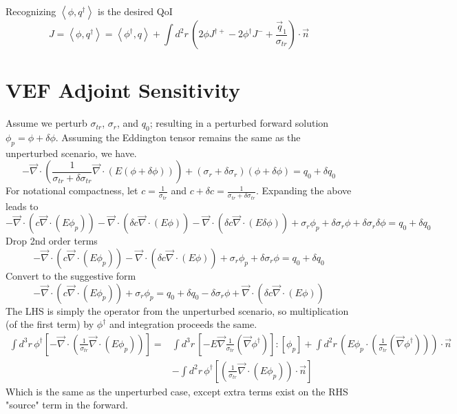\documentclass{article}
\newcommand{\bra}{\left\langle}
\newcommand{\ket}{\right\rangle}
\newcommand{\vdiv}{\vec{\nabla} \cdot}
\newcommand{\vgrad}{\vec{\nabla}}
\begin{document}
Recognizing $\bra \phi, q^\dag \ket $ is the desired QoI
\[
J = \bra \phi, q^\dag \ket = \bra \phi^\dag , q \ket + \int d^2 r \, \left(  2\phi J^{ \dag + } - 2\phi^\dag J^-  + \frac{\vec{q}_1}{\sigma_{tr}} \right) \cdot \vec{n}
\]
\section{VEF Adjoint Sensitivity}
Assume we perturb $\sigma_{tr}$, $\sigma_r$, and $q_0$; resulting in a perturbed forward solution $\phi_p = \phi + \delta \phi$. Assuming the Eddington tensor remains the same as the unperturbed scenario, we have.
\[
-\vdiv \left( \frac{1}{\sigma_{tr}+\delta \sigma_{tr}} \vdiv \left( E \left( \phi + \delta \phi \right) \right) \right)
+ \left( \sigma_r + \delta \sigma_r \right) \left( \phi + \delta \phi \right)
= q_0 + \delta q_0
\]
For notational compactness, let $c=\frac{1}{\sigma_{tr}}$ and $c + \delta c = \frac{1}{\sigma_{tr}+\delta \sigma_{tr}}$. Expanding the above leads to 
\[ 
-\vdiv \left( c \vdiv \left( E \phi_p \right) \right) 
- \vdiv \left( \delta c \vdiv \left( E \phi \right) \right) 
- \vdiv \left( \delta c \vdiv \left( E \delta \phi \right) \right) 
+ \sigma_r \phi_p
+ \delta \sigma_r \phi
+ \delta \sigma_r \delta \phi
= q_0 + \delta q_0 
\]
Drop 2nd order terms
\[ 
-\vdiv \left( c \vdiv \left( E \phi_p \right) \right) 
- \vdiv \left( \delta c \vdiv \left( E \phi \right) \right) 
+ \sigma_r \phi_p
+ \delta \sigma_r \phi
= q_0 + \delta q_0 
\]
Convert to the suggestive form
\[ 
-\vdiv \left( c \vdiv \left( E \phi_p \right) \right) + \sigma_r \phi_p
= q_0 + \delta q_0 - \delta \sigma_r \phi + \vdiv \left( \delta c \vdiv \left( E \phi \right) \right) 
\]
The LHS is simply the operator from the unperturbed scenario, so multiplication (of the first term) by $\phi^\dag$ and integration proceeds the same.
\begin{align*}
\int d^3r \, \phi^\dag \left[  -\vdiv \left( \frac{1}{\sigma_{tr}} \vdiv \left( E \phi_p \right) \right) \right] 
=& \int d^3r \, \left[- E \vgrad \frac{1}{ \sigma_{tr}} \left(  \vgrad \phi^\dag \right) \right] : \left[ \phi_p \right] 
+ \int d^2 r \, \left( E \phi_p \cdot \left( \frac{1}{ \sigma_{tr}} \left(  \vgrad \phi^\dag \right) \right) \right) \cdot \vec{n} \\
&- \int d^2 r \, \phi^\dag \left[ \left( \frac{1}{\sigma_{tr}} \vdiv \left( E \phi_p \right) \right) \cdot \vec{n} \right]
\end{align*}
Which is the same as the unperturbed case, except extra terms exist on the RHS "source" term in the forward.
\end{document}
